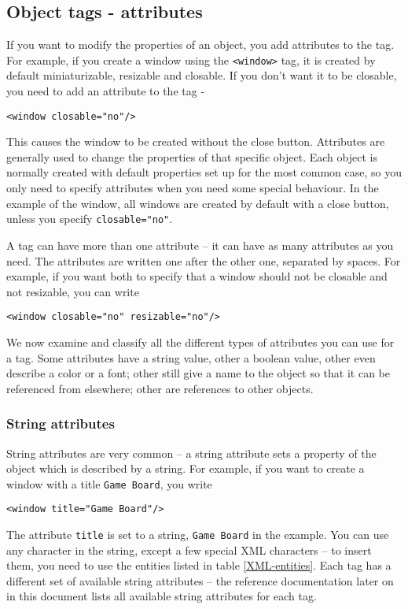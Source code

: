 \subsection{Object tags - attributes}
If you want to modify the properties of an object, you add attributes
to the tag.  For example, if you create a window using the
\texttt{<window>} tag, it is created by default miniaturizable, resizable and 
closable.  If you don't want it to be closable, you need to add an attribute
to the tag -
\begin{verbatim}
<window closable="no"/>
\end{verbatim}
This causes the window to be created without the close button.
Attributes are generally used to change the properties of that
specific object.  Each object is normally created with default
properties set up for the most common case, so you only need to
specify attributes when you need some special behaviour.  In the
example of the window, all windows are created by default with a close
button, unless you specify \texttt{closable="no"}.

A tag can have more than one attribute -- it can have as many
attributes as you need.  The attributes are written one after the
other one, separated by spaces.  For example, if you want both to specify
that a window should not be closable and not resizable, you can write
\begin{verbatim}
<window closable="no" resizable="no"/>
\end{verbatim}

We now examine and classify all the different types of attributes you
can use for a tag.  Some attributes have a string value, other a
boolean value, other even describe a color or a font; other still give
a name to the object so that it can be referenced from elsewhere;
other are references to other objects.

\subsubsection{String attributes}
String attributes are very common -- a string attribute sets a
property of the object which is described by a string.  For example,
if you want to create a window with a title \texttt{Game Board}, you
write
\begin{verbatim}
<window title="Game Board"/>
\end{verbatim}
The attribute \texttt{title} is set to a string, \texttt{Game Board}
in the example.  You can use any character in the string, except a few
special XML characters -- to insert them, you need to use the entities
listed in table \ref{XML-entities}.  Each tag has a different set of
available string attributes -- the reference documentation later on in
this document lists all available string attributes for each tag.

